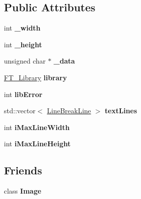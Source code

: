 \subsection*{Public Attributes}
\begin{DoxyCompactItemize}
\item 
\mbox{\label{classBitmapDC_a487c27561b3fa6100aa7f8a14339b4e9}} 
int {\bfseries \+\_\+width}
\item 
\mbox{\label{classBitmapDC_a27823f01ba8877b177b115a9ff9aa5ac}} 
int {\bfseries \+\_\+height}
\item 
\mbox{\label{classBitmapDC_a2b25b9d7543366979c1b787bc4821c51}} 
unsigned char $\ast$ {\bfseries \+\_\+data}
\item 
\mbox{\label{classBitmapDC_a17889cede81da9640d1474a1bc314445}} 
\hyperlink{structFT__LibraryRec__}{F\+T\+\_\+\+Library} {\bfseries library}
\item 
\mbox{\label{classBitmapDC_a50d9e89280edfeed1fef01e34d1dde03}} 
int {\bfseries lib\+Error}
\item 
\mbox{\label{classBitmapDC_a646eee71253b31008c53751a7be8fca9}} 
std\+::vector$<$ \hyperlink{structLineBreakLine}{Line\+Break\+Line} $>$ {\bfseries text\+Lines}
\item 
\mbox{\label{classBitmapDC_a748831709dcea9809fda24ae3f5875aa}} 
int {\bfseries i\+Max\+Line\+Width}
\item 
\mbox{\label{classBitmapDC_aa1d5355a0acbcc8ba9e4befd64b55f00}} 
int {\bfseries i\+Max\+Line\+Height}
\end{DoxyCompactItemize}
\subsection*{Friends}
\begin{DoxyCompactItemize}
\item 
\mbox{\label{classBitmapDC_abbe0c74b95d97226a5e1f28a814631b8}} 
class {\bfseries Image}
\end{DoxyCompactItemize}


